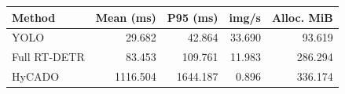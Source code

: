 \begin{tabular}{lrrrr}
\toprule
Method & Mean (ms) & P95 (ms) & img/s & Alloc. MiB\\
\midrule
YOLO & 29.682 & 42.864 & 33.690 & 93.619\\
Full RT-DETR & 83.453 & 109.761 & 11.983 & 286.294\\
HyCADO & 1116.504 & 1644.187 & 0.896 & 336.174\\
\bottomrule
\end{tabular}
